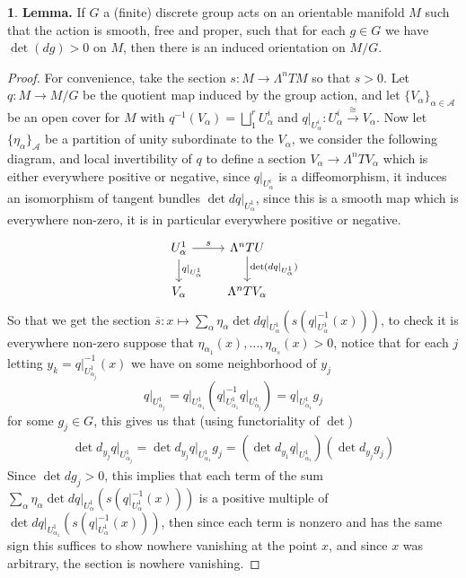 \documentclass[10.5pt]{article}
\theoremstyle{definition}
\newtheorem{pb}{}
\newcommand{\set}[1]{\{#1\}}
\begin{document}
    \begin{pb}
        \textbf{Lemma.} If \(G\) a (finite) discrete group acts on an orientable manifold \(M\) such that the action is smooth, free and proper, such that for each \(g \in G\) we have \(\det (d g) > 0\) on \(M\), then there is an induced orientation on \(M/G\).
        \begin{proof}
            For convenience, take the section \(s: M \to \Lambda^n TM\) so that \(s > 0\). Let \(q: M \to M/G\) be the quotient map induced by the group action, and let \(\set{V_\alpha}_{\alpha \in \mathcal{A}}\) be an open cover for \(M\) with \(q^{-1}(V_\alpha) = \bigsqcup_1^r U_\alpha^i\) and \(q\vert_{U_\alpha^i}: U_\alpha^i \overset{\cong}{\longrightarrow} V_\alpha\). Now let \(\set{\eta_\alpha}_\mathcal{A}\) be a partition of unity subordinate to the \(V_\alpha\), we consider the following diagram, and local invertibility of \(q\) to define a section \(V_\alpha \to \Lambda^n TV_\alpha\) which is either everywhere positive or negative, since \(q\vert_{U_\alpha^i}\) is a diffeomorphism, it induces an isomorphism of tangent bundles \(\det dq\vert_{U_\alpha^1}\), since this is a smooth map which is everywhere non-zero, it is in particular everywhere positive or negative.
            \begin{equation*}
                \begin{tikzcd}
                    U_\alpha^1 \arrow[d,"q\vert_{U_\alpha^1}"] \arrow[r,"s"] & \Lambda^nTU \arrow[d, "\det(dq\vert_{U_\alpha^1})"] \\
                    V_\alpha & \Lambda^n TV_\alpha
                \end{tikzcd}
            \end{equation*}
            So that we get the section \(\overline{s}: x \mapsto \sum_\alpha \eta_\alpha \det dq\vert_{U_\alpha^1}(s(q\vert_{U_\alpha^1}^{-1}(x)))\), to check it is everywhere non-zero suppose that \(\eta_{\alpha_1}(x),\hdots,\eta_{\alpha_s}(x) > 0\), notice that for each \(j\) letting \(y_k = q\vert_{U^1_{\alpha_j}}^{-1}(x)\) we have on some neighborhood of \(y_j\)
            \[q\vert_{U^1_{\alpha_j}} = q\vert_{U_{\alpha_1}^1}\left(q\vert^{-1}_{U^1_{\alpha_1}}q\vert_{U^1_{\alpha_j}}\right) = q\vert_{U_{\alpha_1}^1}g_j\]
            for some \(g_j \in G\), this gives us that (using functoriality of \(\det\))
            \begin{align*}
                \det d_{y_j}q\vert_{U_{\alpha_j}^1} = \det d_{y_j}q\vert_{U_{\alpha_1}^1}g_j = \left(\det d_{y_1}q\vert_{U_{\alpha_1}^1}\right)\left(\det d_{y_j}g_j\right)
            \end{align*}
            Since \(\det dg_j > 0\), this implies that each term of the sum \(\sum_\alpha \eta_\alpha \det dq\vert_{U_\alpha^1}(s(q\vert_{U_\alpha^1}^{-1}(x)))\) is a positive multiple of \(\det dq\vert_{U_{\alpha_1}^1}(s(q\vert_{U_\alpha^1}^{-1}(x)))\), then since each term is nonzero and has the same sign this suffices to show nowhere vanishing at the point \(x\), and since \(x\) was arbitrary, the section is nowhere vanishing.
        \end{proof}


\end{pb}
\end{document}
